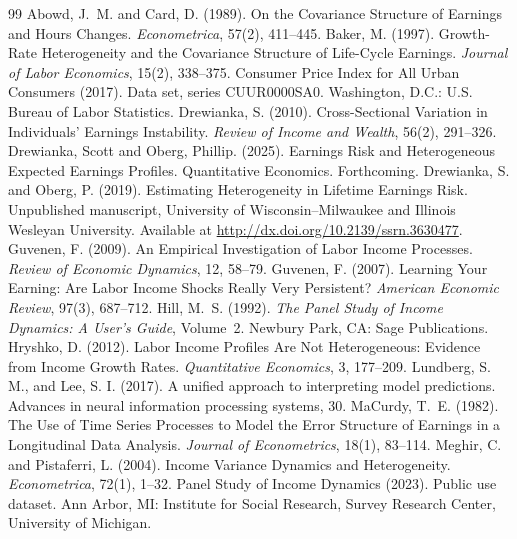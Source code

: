 \documentclass[12pt]{article}
\begin{document}
\begin{thebibliography}{99}
 Abowd, J.~M. and Card, D. (1989). On the Covariance Structure of Earnings and Hours Changes. \textit{Econometrica}, 57(2), 411--445.
 Baker, M. (1997). Growth-Rate Heterogeneity and the Covariance Structure of Life-Cycle Earnings. \textit{Journal of Labor Economics}, 15(2), 338--375.
 Consumer Price Index for All Urban Consumers (2017). Data set, series CUUR0000SA0. Washington, D.C.: U.S. Bureau of Labor Statistics.
 Drewianka, S. (2010). Cross-Sectional Variation in Individuals’ Earnings Instability. \textit{Review of Income and Wealth}, 56(2), 291--326.
Drewianka, Scott and Oberg, Phillip. (2025). Earnings Risk and Heterogeneous Expected Earnings Profiles. Quantitative Economics. Forthcoming.
 Drewianka, S. and Oberg, P. (2019). Estimating Heterogeneity in Lifetime Earnings Risk. Unpublished manuscript, University of Wisconsin--Milwaukee and Illinois Wesleyan University. Available at \url{http://dx.doi.org/10.2139/ssrn.3630477}.
 Guvenen, F. (2009). An Empirical Investigation of Labor Income Processes. \textit{Review of Economic Dynamics}, 12, 58--79.
 Guvenen, F. (2007). Learning Your Earning: Are Labor Income Shocks Really Very Persistent? \textit{American Economic Review}, 97(3), 687--712.
 Hill, M.~S. (1992). \textit{The Panel Study of Income Dynamics: A User’s Guide}, Volume~2. Newbury Park, CA: Sage Publications.
 Hryshko, D. (2012). Labor Income Profiles Are Not Heterogeneous: Evidence from Income Growth Rates. \textit{Quantitative Economics}, 3, 177--209.
 Lundberg, S. M., and Lee, S. I. (2017). A unified approach to interpreting model predictions. Advances in neural information processing systems, 30.
 MaCurdy, T.~E. (1982). The Use of Time Series Processes to Model the Error Structure of Earnings in a Longitudinal Data Analysis. \textit{Journal of Econometrics}, 18(1), 83--114.
 Meghir, C. and Pistaferri, L. (2004). Income Variance Dynamics and Heterogeneity. \textit{Econometrica}, 72(1), 1--32.
 Panel Study of Income Dynamics (2023). Public use dataset. Ann Arbor, MI: Institute for Social Research, Survey Research Center, University of Michigan.



\end{thebibliography}
\end{document}
